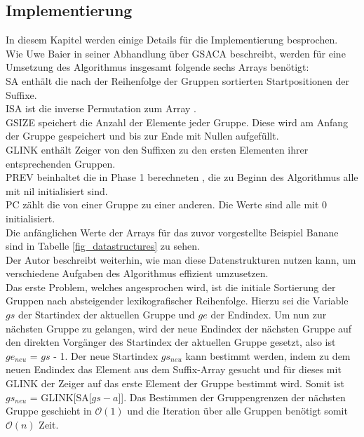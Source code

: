 \newpage
\subsection{Implementierung}
\label{gsaca:chapter5}
%
In diesem Kapitel werden einige Details für die Implementierung besprochen. \\

Wie Uwe Baier in seiner Abhandlung über GSACA beschreibt, werden für eine Umsetzung des Algorithmus insgesamt folgende sechs Arrays benötigt:\\
SA enthält die nach der Reihenfolge der Gruppen sortierten Startpositionen der Suffixe. \\
ISA ist die inverse Permutation zum Array \sa. \\
GSIZE speichert die Anzahl der Elemente jeder Gruppe. 
Diese wird am Anfang der Gruppe gespeichert und bis zur Ende mit Nullen aufgefüllt.\\
GLINK enthält Zeiger von den Suffixen zu den ersten Elementen ihrer entsprechenden Gruppen. \\
PREV beinhaltet die in Phase 1 berechneten \prevpointer, die zu Beginn des Algorithmus alle mit nil initialisiert sind.\\
PC zählt die \prevpointer von einer Gruppe zu einer anderen. 
Die Werte sind alle mit 0 initialisiert.\\
Die anfänglichen Werte der Arrays für das zuvor vorgestellte Beispiel Banane sind in Tabelle \ref{fig_datastructures} zu sehen.\\



Der Autor beschreibt weiterhin, wie man diese Datenstrukturen nutzen kann, um verschiedene Aufgaben des Algorithmus effizient umzusetzen.\\

Das erste Problem, welches angesprochen wird, ist die initiale Sortierung der Gruppen nach absteigender lexikografischer Reihenfolge. 
Hierzu sei die Variable $gs$ der Startindex der aktuellen Gruppe und $ge$ der Endindex. 
Um nun zur nächsten Gruppe zu gelangen, wird der neue Endindex der nächsten Gruppe auf den direkten Vorgänger des Startindex der aktuellen Gruppe gesetzt, also ist $ge_{neu}$ = $gs$ - 1. 
Der neue Startindex $gs_{neu}$ kann bestimmt werden, indem zu dem neuen Endindex das Element aus dem Suffix-Array \sa gesucht und für dieses mit GLINK der Zeiger auf das erste Element der Gruppe bestimmt wird. 
Somit ist $gs_{neu}$ = GLINK[SA[$gs - a$]]. 
Das Bestimmen der Gruppengrenzen der nächsten Gruppe geschieht in $\mathcal O(1)$ und die Iteration über alle Gruppen benötigt somit $\mathcal O(n)$ Zeit.\\

